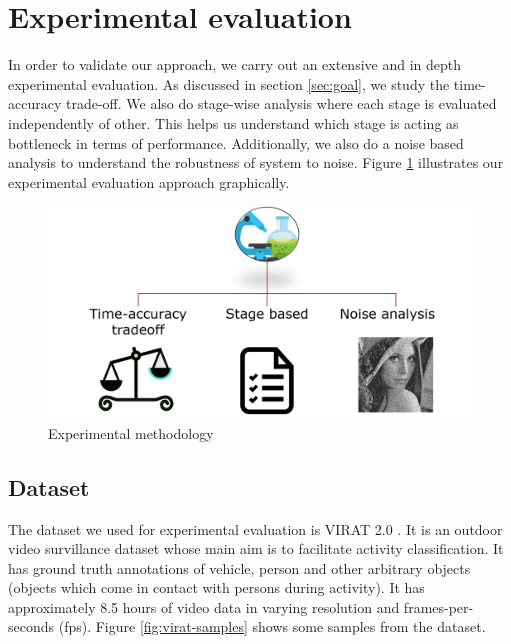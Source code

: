 \section{Experimental evaluation}
In order to validate our approach, we carry out an extensive and in depth experimental evaluation. As discussed in section \ref{sec:goal}, we study the time-accuracy trade-off. We also do stage-wise analysis where each stage is evaluated independently of other. This helps us understand which stage is acting as bottleneck in terms of performance. Additionally, we also do a noise based analysis to understand the robustness of system to noise. Figure \ref{fig:experimental-methdology} illustrates our experimental evaluation approach graphically. 

\begin{figure}[ht]
    \centering
    \includegraphics[width=\linewidth]{images/experimental-methdology.PNG}
    \caption{Experimental methodology }
    \label{fig:experimental-methdology}
\end{figure}

\subsection{Dataset}
The dataset we used for experimental evaluation is VIRAT 2.0 \cite{virat20}. It is an outdoor video survillance dataset whose main aim is to facilitate activity classification. It has ground truth annotations of vehicle, person and other arbitrary objects (objects which come in contact with persons during activity). It has approximately 8.5 hours of video data in varying resolution and frames-per-seconds (fps). Figure \ref{fig:virat-samples} shows some samples from the dataset. 

